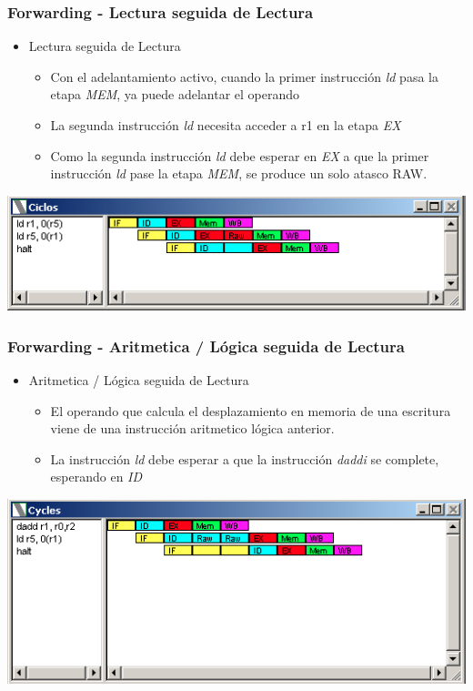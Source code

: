 \documentclass{beamer}
\begin{document}
\begin{frame}[fragile]
\frametitle{Forwarding - Lectura seguida de Lectura}
\begin{itemize}
\item Lectura seguida de Lectura
\begin{itemize}
\item Con el adelantamiento activo, cuando la primer instrucción \emph{ld} pasa la etapa \emph{MEM}, ya puede adelantar el operando
\item La segunda instrucción \emph{ld} necesita acceder a r1 en la etapa \emph{EX}
\item Como la segunda instrucción \emph{ld} debe esperar en \emph{EX} a que la primer instrucción  \emph{ld} pase la etapa \emph{MEM}, se produce un solo atasco RAW.

\end{itemize}
\end{itemize}
\includegraphics[scale=0.45]{forwarding-7-lectura-lectura.png}
\end{frame}


\begin{frame}[fragile]
\frametitle{Forwarding - Aritmetica / Lógica seguida de Lectura}
\begin{itemize}
\item Aritmetica / Lógica seguida de Lectura
\begin{itemize}
\item El operando que calcula el desplazamiento en memoria de una escritura viene de una instrucción aritmetico lógica anterior.
\item La instrucción \emph{ld} debe esperar a que la instrucción \emph{daddi} se complete, esperando en \emph{ID}
\end{itemize}
\end{itemize}
\includegraphics[scale=0.45]{forwarding-8.png}
\end{frame}
\end{document}
